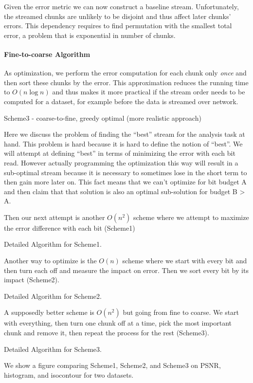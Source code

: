 Given the error metric we can now construct a baseline stream. Unfortunately, the streamed chunks are unlikely
to be disjoint and thus affect later chunks' errors. This dependency requires to find permutation with the smallest
total error, a problem that is exponential in number of chunks. 

\paragraph*{Fine-to-coarse Algorithm}

As optimization, we perform the error computation for each chunk only {\em once} and then sort these chunks
by the error. This approximation reduces the running time to $O(n \log n)$ and thus makes it more practical if
the stream order needs to be computed for a dataset, for example before the data is streamed over network.



Scheme3 - coarse-to-fine, greedy optimal (more realistic approach)


Here we discuss the problem of finding the ``best'' stream for the analysis task at hand. This problem is hard because it is hard to define the notion of ``best''. We will attempt at defining ``best'' in terms of minimizing the error with each bit read. However actually programming the optimization this way will result in a sub-optimal stream because it is necessary to sometimes lose in the short term to then gain more later on. This fact means that we can't optimize for bit budget A and then claim that that solution is also an optimal sub-solution for budget B > A.

Then our next attempt is another $O(n^2)$ scheme where we attempt to maximize the error difference with each bit (Scheme1)

Detailed Algorithm for Scheme1.

Another way to optimize is the $O(n)$ scheme where we start with every bit and then turn each off and measure the impact on error. Then we sort every bit by its impact (Scheme2).

Detailed Algorithm for Scheme2.

A supposedly better scheme is $O(n^2)$ but going from fine to coarse. We start with everything, then turn one chunk off at a time, pick the most important chunk and remove it, then repeat the process for the rest (Scheme3).

Detailed Algorithm for Scheme3.

We show a figure comparing Scheme1, Scheme2, and Scheme3 on PSNR, histogram, and isocontour for two datasets.
